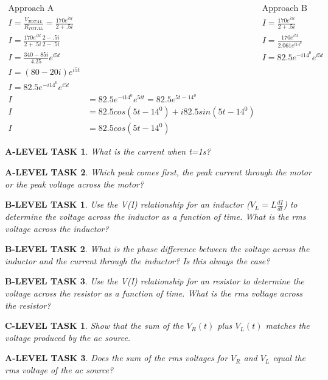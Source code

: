 \documentclass{book}
\numberwithin{equation}{section}
\newtheorem{alevel}{A-LEVEL TASK}
\newtheorem{blevel}{B-LEVEL TASK}
\newtheorem{clevel}{C-LEVEL TASK}
\theoremstyle{definition}
\begin{document}
\begin{align*}
\text{Approach A}&&\text{Approach B}\\
I = \frac{V_{TOTAL}}{R_{TOTAL}}=\frac{170e^{i5t}}{2+.5i}&&I = \frac{170e^{i5t}}{2+.5i}\\
I=\frac{170e^{i5t}}{2+.5i}\frac{2-.5i}{2-.5i}&&I = \frac{170e^{i5t}}{2.061e^{i14^0}}\\
I=\frac{340-85i}{4.25}e^{i5t}&&I = 82.5e^{-i14^0}e^{i5t}\\
I=(80-20i)e^{i5t}&&\\
I=82.5e^{-i14^0}e^{i5t}&&\\
I&=82.5e^{-i14^0}e^{5it}=82.5e^{5t-14^0}\\
I&=82.5cos(5t-14^0)+i82.5sin(5t-14^0)\\
I&=82.5cos(5t-14^0)
\end{align*}

\begin{alevel}
What is the current when t=1s?
\end{alevel}

\begin{alevel}
Which peak comes first, the peak current through the motor or the peak voltage across the motor?
\end{alevel}

\begin{blevel}
Use the V(I) relationship for an inductor ($V_L=L\frac{dI}{dt}$) to determine the voltage across the inductor as a function of time. What is the rms voltage across the inductor?
\end{blevel}

\begin{blevel}
What is the phase difference between the voltage across the inductor and the current through the inductor? Is this always the case?
\end{blevel}

\begin{blevel}
Use the V(I) relationship for an resistor to determine the voltage across the resistor as a function of time. What is the rms voltage across the resistor?
\end{blevel}

\begin{clevel}
Show that the sum of the $V_R(t)$ plus $V_L(t)$ matches the voltage produced by the ac source.
\end{clevel}

\begin{alevel}
Does the sum of the rms voltages for $V_R$ and $V_L$ equal the rms voltage of the ac source?
\end{alevel}
\end{document}
